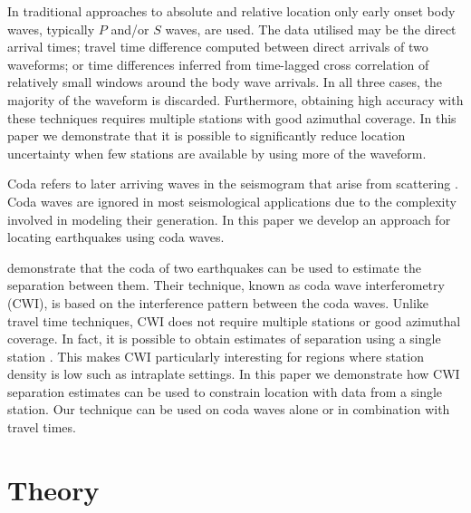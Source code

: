 \documentclass[extra, onecolumn, doublespacing]{gji}
\begin{document}
In traditional approaches to absolute and relative location only
early onset body waves, typically $P$ and/or $S$ waves, are used.
The data utilised may be the direct arrival times; travel time
difference computed between direct arrivals of two waveforms; or
time differences inferred from time-lagged cross correlation of
relatively small windows around the body wave arrivals.
 In all three cases, the majority of the
waveform is discarded. Furthermore, obtaining high accuracy with these techniques
requires multiple stations with good azimuthal coverage.
In this paper we demonstrate that it is possible to
significantly reduce location uncertainty when few stations are
available by using more of the waveform.

Coda refers to  later arriving waves in the seismogram that arise
from scattering  \citep{dr_Aki69a,dr_Snieder99a,dr_Snieder06a}. Coda
waves are ignored in most seismological applications due to the
complexity involved in modeling their generation. In this paper we
develop an approach for locating earthquakes using coda waves.

\citet{dr_Snieder05a} demonstrate that the coda of two earthquakes
can be used to estimate the separation between them. Their
technique, known as coda wave interferometry (CWI), is based on the
interference pattern between the coda waves. Unlike travel time
techniques, CWI
 does not require multiple stations or good azimuthal coverage.
In fact, it is possible to obtain estimates of separation using a single
station \citep{dr_Robinson07b}. This makes CWI particularly interesting
for regions where station density is low such as intraplate settings. In this
paper we demonstrate how CWI separation estimates can be used to constrain
location with data from a single station.
Our technique can be used on coda waves alone or in combination with
travel times.

\section{Theory}
\label{sec:theory}
\end{document}
